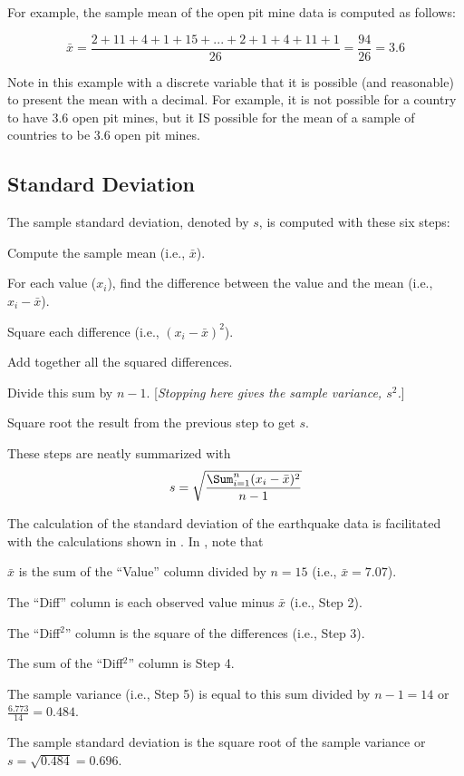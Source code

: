 \documentclass[10pt,openany]{book}\usepackage[]{graphicx}\usepackage[]{color}
\begin{document}
For example, the sample mean of the open pit mine data is computed as follows:

\[ \bar{x} = \frac{2+11+4+1+15+ ... +2+1+4+11+1}{26} = \frac{94}{26} = 3.6  \]

Note in this example with a discrete variable that it is possible (and reasonable) to present the mean with a decimal. For example, it is not possible for a country to have 3.6 open pit mines, but it IS possible for the mean of a sample of countries to be 3.6 open pit mines.




\subsection{Standard Deviation}\label{sect:StdDev}
The sample standard deviation, denoted by $s$, is computed with these six steps:
\begin{Enumerate}
  \item Compute the sample mean (i.e., $\bar{x}$).
  \item For each value ($x_{i}$), find the difference between the value and the mean (i.e., $x_{i}-\bar{x}$).
  \item Square each difference (i.e., $(x_{i}-\bar{x})^{2}$).
  \item Add together all the squared differences.
  \item Divide this sum by $n-1$. [\textit{Stopping here gives the sample variance, $s^{2}$.}]
  \item Square root the result from the previous step to get $s$.
\end{Enumerate}

These steps are neatly summarized with
\vspace{-6pt}
\begin{equation}
  \label{eqn:SampleSD}
     s = \sqrt{\frac{\Sum_{i=1}^{n}(x_{i}-\bar{x})^{2}}{n-1}}
\end{equation}

The calculation of the standard deviation of the earthquake data  is facilitated with the calculations shown in . In , note that
\vspace{-6pt}
\begin{Itemize}
  \item $\bar{x}$ is the sum of the ``Value'' column divided by $n=15$ (i.e., $\bar{x}=7.07$).
  \item The ``Diff'' column is each observed value minus $\bar{x}$ (i.e., Step 2).
  \item The ``Diff$^2$'' column is the square of the differences (i.e., Step 3).
  \item The sum of the ``Diff$^2$'' column is Step 4.
  \item The sample variance (i.e., Step 5) is equal to this sum divided by $n-1=14$ or $\frac{6.773}{14}=0.484$.
  \item The sample standard deviation is the square root of the sample variance or $s=\sqrt{0.484}=0.696$.
\end{Itemize}
\end{document}
